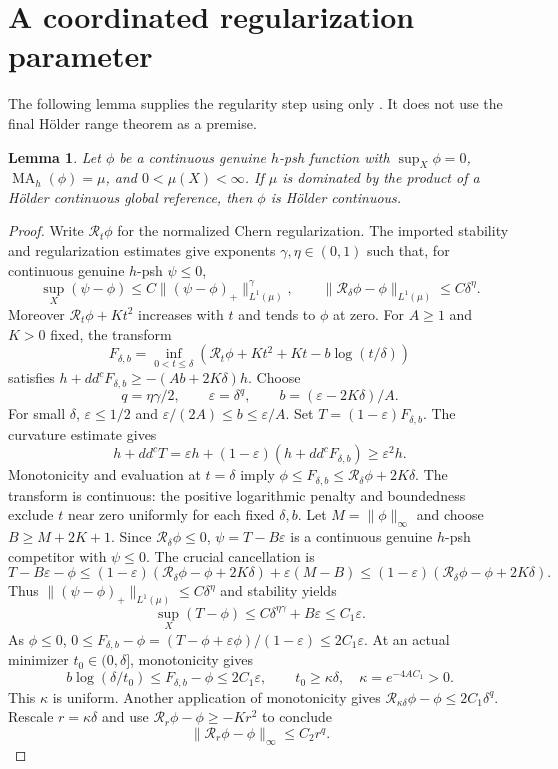 \documentclass[11pt]{article}
\newcommand{\ddc}{dd^c}
\newcommand{\MA}{\operatorname{MA}}
\newtheorem{lemma}[theorem]{Lemma}
\begin{document}
\section{A coordinated regularization parameter}
The following lemma supplies the regularity step using only
\cite[Proposition 2.4 and Lemmas 2.7--2.8]{KN}. It does not use the
final H\"older range theorem as a premise.
\begin{lemma}\label{lem:repair}
Let $\phi$ be a continuous genuine $h$-psh function with $\sup_X\phi=0$,
$\MA_h(\phi)=\mu$, and $0<\mu(X)<\infty$.
If $\mu$ is dominated by the product of a H\"older continuous global
reference, then $\phi$ is H\"older continuous.
\end{lemma}
\begin{proof}
Write $\mathcal R_t\phi$ for the normalized Chern regularization.
The imported stability and regularization estimates give exponents
$\gamma,\eta\in(0,1)$ such that, for continuous genuine $h$-psh $\psi\leq0$,
\[
 \sup_X(\psi-\phi)\leq C\|(\psi-\phi)_+\|_{L^1(\mu)}^\gamma,
 \qquad\|\mathcal R_\delta\phi-\phi\|_{L^1(\mu)}\leq C\delta^\eta.
\]
Moreover $\mathcal R_t\phi+Kt^2$ increases with $t$ and tends to $\phi$
at zero. For $A\geq1$ and $K>0$ fixed, the transform
\[
 F_{\delta,b}=\inf_{0<t\leq\delta}
 \left(\mathcal R_t\phi+Kt^2+Kt-b\log(t/\delta)\right)
\]
satisfies $h+\ddc F_{\delta,b}\geq-(Ab+2K\delta)h$.
Choose
\[
 q=\eta\gamma/2,\qquad\varepsilon=\delta^q,
 \qquad b=(\varepsilon-2K\delta)/A.
\]
For small $\delta$, $\varepsilon\leq1/2$ and
$\varepsilon/(2A)\leq b\leq\varepsilon/A$.
Set $T=(1-\varepsilon)F_{\delta,b}$. The curvature estimate gives
\[
 h+\ddc T=\varepsilon h+(1-\varepsilon)(h+\ddc F_{\delta,b})
 \geq\varepsilon^2h.
\]
Monotonicity and evaluation at $t=\delta$ imply
$\phi\leq F_{\delta,b}\leq\mathcal R_\delta\phi+2K\delta$.
The transform is continuous: the positive logarithmic penalty and
boundedness exclude $t$ near zero uniformly for each fixed $\delta,b$.
Let $M=\|\phi\|_\infty$ and choose $B\geq M+2K+1$.
Since $\mathcal R_\delta\phi\leq0$, $\psi=T-B\varepsilon$ is a continuous
genuine $h$-psh competitor with $\psi\leq0$. The crucial cancellation is
\[
 T-B\varepsilon-\phi
 \leq(1-\varepsilon)(\mathcal R_\delta\phi-\phi+2K\delta)
       +\varepsilon(M-B)
 \leq(1-\varepsilon)(\mathcal R_\delta\phi-\phi+2K\delta).
\]
Thus $\|(\psi-\phi)_+\|_{L^1(\mu)}\leq C\delta^\eta$ and stability yields
\[
 \sup_X(T-\phi)\leq C\delta^{\eta\gamma}+B\varepsilon\leq C_1\varepsilon.
\]
As $\phi\leq0$,
$0\leq F_{\delta,b}-\phi=(T-\phi+\varepsilon\phi)/(1-\varepsilon)
\leq2C_1\varepsilon$.
At an actual minimizer $t_0\in(0,\delta]$, monotonicity gives
\[
 b\log(\delta/t_0)\leq F_{\delta,b}-\phi\leq2C_1\varepsilon,
 \qquad t_0\geq\kappa\delta,\quad\kappa=e^{-4AC_1}>0.
\]
This $\kappa$ is uniform. Another application of monotonicity gives
$\mathcal R_{\kappa\delta}\phi-\phi\leq2C_1\delta^q$.
Rescale $r=\kappa\delta$ and use
$\mathcal R_r\phi-\phi\geq-Kr^2$ to conclude
\begin{equation}\label{eq:uniform-smoothing}
 \|\mathcal R_r\phi-\phi\|_\infty\leq C_2r^q.
\end{equation}


\end{proof}
\end{document}
